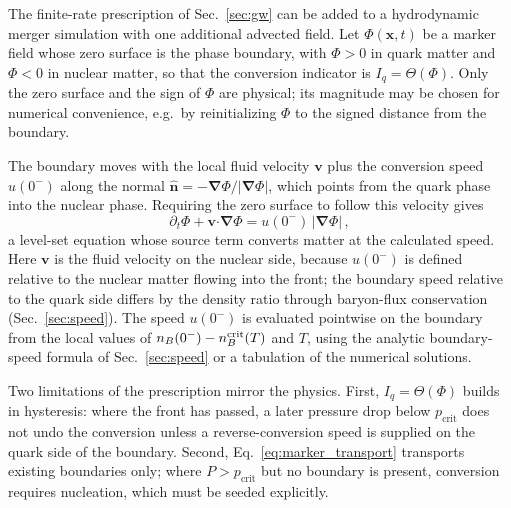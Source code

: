 \documentclass[10pt,superscriptaddress,amsmath,aps,prc,twocolumn,nofootinbib,floatfix]{revtex4-1}
\begin{document}
The finite-rate prescription of Sec.~\ref{sec:gw} can be added to a hydrodynamic merger simulation with one additional advected field.
Let $\Phi(\boldsymbol{x},t)$ be a marker field whose zero surface is the phase boundary, with $\Phi>0$ in quark matter and $\Phi<0$ in nuclear matter, so that the conversion indicator is $I_q=\Theta(\Phi)$.
Only the zero surface and the sign of $\Phi$ are physical; its magnitude may be chosen for numerical convenience, e.g.\ by reinitializing $\Phi$ to the signed distance from the boundary.

The boundary moves with the local fluid velocity $\boldsymbol{v}$ plus the conversion speed $u(0^-)$ along the normal $\widehat{\boldsymbol{n}}=-\boldsymbol{\nabla}\Phi/|\boldsymbol{\nabla}\Phi|$, which points from the quark phase into the nuclear phase.
Requiring the zero surface to follow this velocity gives
\begin{equation}
\partial_t\Phi
+\boldsymbol{v}\boldsymbol{\cdot}\boldsymbol{\nabla}\Phi
=u(0^-)\,\bigl|\boldsymbol{\nabla}\Phi\bigr|\,,
\label{eq:marker_transport}
\end{equation}
a level-set equation whose source term converts matter at the calculated speed.
Here $\boldsymbol{v}$ is the fluid velocity on the nuclear side, because $u(0^-)$ is defined relative to the nuclear matter flowing into the front; the boundary speed relative to the quark side differs by the density ratio through baryon-flux conservation (Sec.~\ref{sec:speed}).
The speed $u(0^-)$ is evaluated pointwise on the boundary from the local values of $n_B(0^-)-n_B^{\rm crit}(T)$ and $T$, using the analytic boundary-speed formula of Sec.~\ref{sec:speed} or a tabulation of the numerical solutions.

Two limitations of the prescription mirror the physics.
First, $I_q=\Theta(\Phi)$ builds in hysteresis: where the front has passed, a later pressure drop below $p_\text{crit}$ does not undo the conversion unless a reverse-conversion speed is supplied on the quark side of the boundary.
Second, Eq.~\eqref{eq:marker_transport} transports existing boundaries only; where $P>p_\text{crit}$ but no boundary is present, conversion requires nucleation, which must be seeded explicitly.



\end{document}
